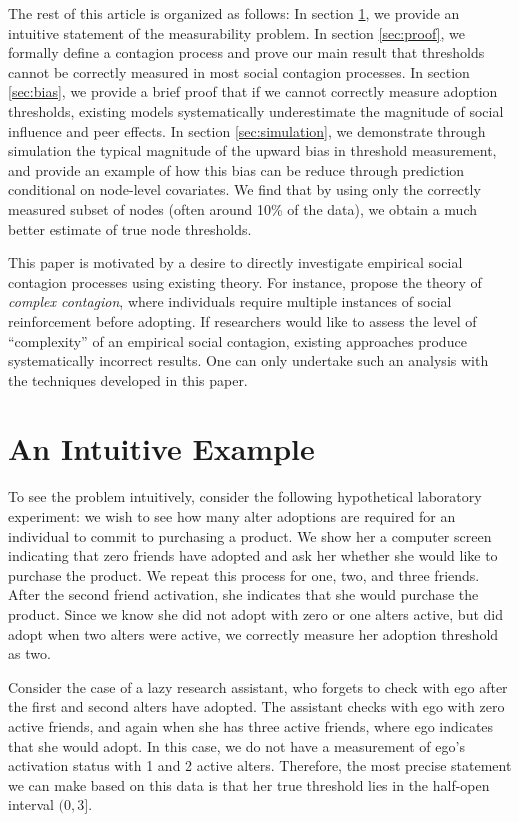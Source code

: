 \documentclass[a4paper]{article}
\begin{document}
The rest of this article is organized as follows: In section \ref{sec:intuition}, we provide an intuitive statement of the measurability problem. In section \ref{sec:proof}, we formally define a contagion process and prove our main result that thresholds cannot be correctly measured in most social contagion processes. In section \ref{sec:bias}, we provide a brief proof that if we cannot correctly measure adoption thresholds, existing models systematically underestimate the magnitude of social influence and peer effects. In section \ref{sec:simulation}, we demonstrate through simulation the typical magnitude of the upward bias in threshold measurement, and provide an example of how this bias can be reduce through prediction conditional on node-level covariates. We find that by using only the correctly measured subset of nodes (often around 10\% of the data), we obtain a much better estimate of true node thresholds.

This paper is motivated by a desire to directly investigate empirical social contagion processes using existing theory. For instance, \cite{Centola2007} propose the theory of \emph{complex contagion}, where individuals require multiple instances of social reinforcement before adopting. If researchers would like to assess the level of ``complexity'' of an empirical social contagion, existing approaches produce systematically incorrect results. One can only undertake such an analysis with the techniques developed in this paper.

\section{An Intuitive Example} \label{sec:intuition}

To see the problem intuitively, consider the following hypothetical laboratory experiment: we wish to see how many alter adoptions are required for an individual to commit to purchasing a product. We show her a computer screen indicating that zero friends have adopted and ask her whether she would like to purchase the product. We repeat this process for one, two, and three friends. After the second friend activation, she indicates that she would purchase the product. Since we know she did not adopt with zero or one alters active, but did adopt when two alters were active, we correctly measure her adoption threshold as two.

Consider the case of a lazy research assistant, who forgets to check with ego after the first and second alters have adopted. The assistant checks with ego with zero active friends, and again when she has three active friends, where ego indicates that she would adopt. In this case, we do not have a measurement of ego's activation status with 1 and 2 active alters. Therefore, the most precise statement we can make based on this data is that her true threshold lies in the half-open interval $(0, 3]$.
\end{document}
